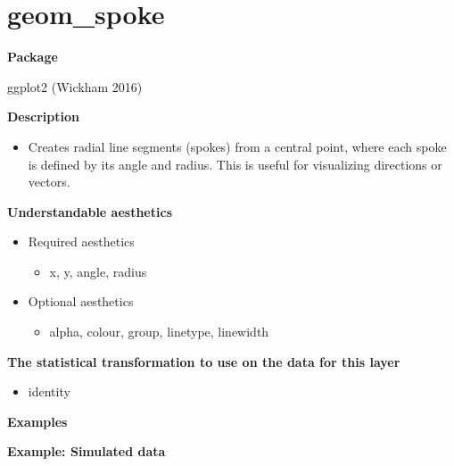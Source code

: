\documentclass[
  letterpaper,
  DIV=11,
  numbers=noendperiod]{scrreprt}
\providecommand{\tightlist}{%
  \setlength{\itemsep}{0pt}\setlength{\parskip}{0pt}}\usepackage{longtable,booktabs,array}
\begin{document}
\section{geom\_spoke}\label{geom_spoke}

\textbf{Package}

ggplot2 (Wickham 2016)

\textbf{Description}

\begin{itemize}
\tightlist
\item
  Creates radial line segments (spokes) from a central point, where each
  spoke is defined by its angle and radius. This is useful for
  visualizing directions or vectors.
\end{itemize}

\textbf{Understandable aesthetics}

\begin{itemize}
\tightlist
\item
  Required aesthetics

  \begin{itemize}
  \tightlist
  \item
    x, y, angle, radius
  \end{itemize}
\item
  Optional aesthetics

  \begin{itemize}
  \tightlist
  \item
    alpha, colour, group, linetype, linewidth
  \end{itemize}
\end{itemize}

\textbf{The statistical transformation to use on the data for this
layer}

\begin{itemize}
\tightlist
\item
  identity
\end{itemize}

\textbf{Examples}

\textbf{Example: Simulated data}
\end{document}
